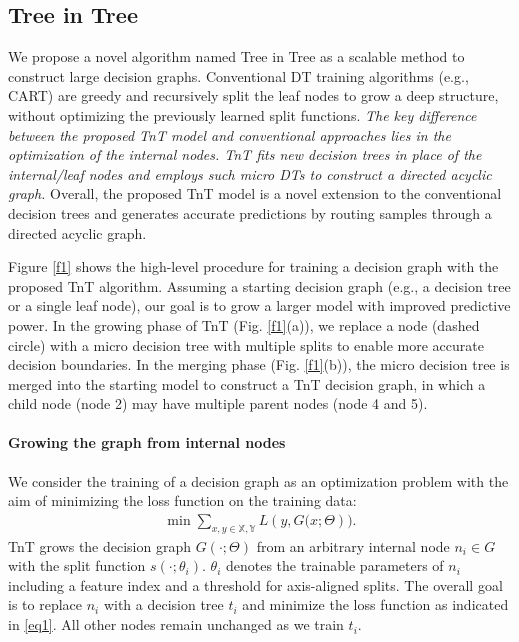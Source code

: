\documentclass{article}
\begin{document}
\subsection{Tree in Tree}\vspace{-2mm}
We propose a novel algorithm named Tree in Tree as a scalable method to construct large decision graphs. Conventional DT training algorithms (e.g., CART) are greedy and recursively split the leaf nodes to grow a deep structure, without optimizing the previously learned split functions. \textit{The key difference between the proposed TnT model and conventional approaches lies in the optimization of the internal nodes. TnT fits new decision trees in place of the internal/leaf nodes and employs such micro DTs to construct a directed acyclic graph.} Overall, the proposed TnT model is a novel extension to the conventional decision trees and generates accurate predictions by routing samples through a directed acyclic graph.

Figure \ref{f1} shows the high-level procedure for training a decision graph with the proposed TnT algorithm. Assuming a starting decision graph (e.g., a decision tree or a single leaf node), our goal is to grow a larger model with improved predictive power. In the growing phase of TnT (Fig. \ref{f1}(a)), we replace a node (dashed circle) with a micro decision tree with multiple splits to enable more accurate decision boundaries. In the merging phase (Fig. \ref{f1}(b)), the micro decision tree is merged into the starting model to construct a TnT decision graph, in which a child node (node 2) may have multiple parent nodes (node 4 and 5). 

\vspace{-2mm}
\paragraph{Growing the graph from internal nodes} We consider the training of a decision graph as an optimization problem with the aim of minimizing the loss function on the training data:
\begin{gather}
\label{eq1}
    \min \sum_{x,y \in \mathbb{X},\mathbb{Y}} L\left(y, G(x; \Theta\right)).
\end{gather}
TnT grows the decision graph $G(\cdot; \Theta)$ from an arbitrary internal node $n_i \in G$ with the split function $s(\cdot; \theta_i)$. $\theta_i$ denotes the trainable parameters of $n_i$ including a feature index and a threshold for axis-aligned splits. The overall goal is to replace $n_i$ with a decision tree $t_i$ and minimize the loss function as indicated in \eqref{eq1}. All other nodes remain unchanged as we train $t_i$.
\end{document}
